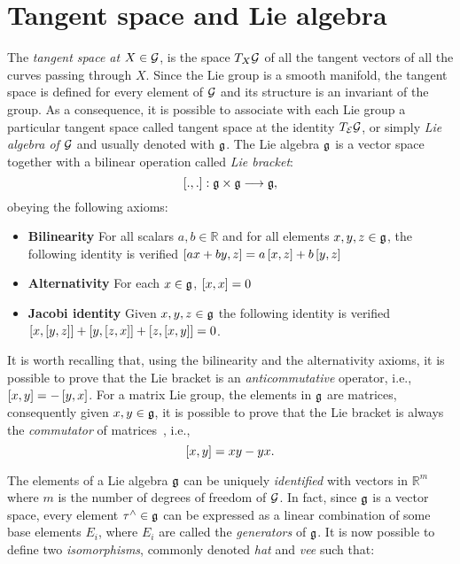 \section{Tangent space and Lie algebra\label{sec:tangent_space_lie}}
The \emph{tangent space at} $X\in \mathcal{G}$, is the space $T_X\mathcal{G}$ of all the tangent vectors of all the curves passing through $X$. Since the Lie group is a smooth manifold, the tangent space is defined for every element of $\mathcal{G}$ and its structure is an invariant of the group. As a consequence, it is possible to associate with each Lie group a particular tangent space called tangent space at the identity $T_{\mathcal{E}}\mathcal{G}$, or simply \emph{Lie algebra of} $\mathcal{G}$ and usually denoted with $\mathfrak{g}$. The Lie algebra $\mathfrak{g}$ is a vector space together with a bilinear operation called \emph{Lie bracket}: 
\begin{equation}
\left[ ., . \right] : \mathfrak{g} \times \mathfrak{g} \longrightarrow \mathfrak{g},
\end{equation}
obeying the following axioms:
\begin{itemize}
    \item \textbf{Bilinearity} For all scalars $a, b \in \mathbb{R}$ and for all elements $x, y, z \in \mathfrak{g}$, the following identity is verified $\left[ ax + by, z \right] = a \left[ x, z \right] + b\left[ y, z \right]$
    \item \textbf{Alternativity} For each $x\in\mathfrak{g}$, $\left[ x, x \right] = 0$
    \item \textbf{Jacobi identity} Given $x, y,  z\in\mathfrak{g}$ the following identity is verified $\left[ x, \left[ y, z \right] \right] + \left[ y, \left[ z, x \right] \right] + \left[ z, \left[ x, y \right] \right] = 0$.
\end{itemize}
It is worth recalling that, using the bilinearity and the alternativity axioms, it is possible to prove that the Lie bracket is an \emph{anticommutative} operator, i.e., $\left[ x, y \right] = -\left[ y, x \right]$. 
For a matrix Lie group, the elements in $\mathfrak{g}$ are matrices, consequently given $x, y \in \mathfrak{g}$, it is possible to prove that the Lie bracket is always the \emph{commutator} of matrices~\citep[Definition 2.19]{Hall2015}, i.e.,
\begin{equation}
\label{eq:lie_bracket}
    \left[ x, y \right] = x y - y x.
\end{equation}
\par
The elements of a Lie algebra $\mathfrak{g}$ can be uniquely \emph{identified} with vectors in $\mathbb{R}^m$ where $m$ is the number of degrees of freedom of $\mathcal{G}$. In fact, since $\mathfrak{g}$ is a vector space, every element $\tau^\wedge \in \mathfrak{g}$ can be expressed as a linear combination of some base elements $E_i$, where $E_i$ are called the \emph{generators} of $\mathfrak{g}$. It is now possible to define two \emph{isomorphisms}, commonly denoted \emph{hat} and \emph{vee} such that:
